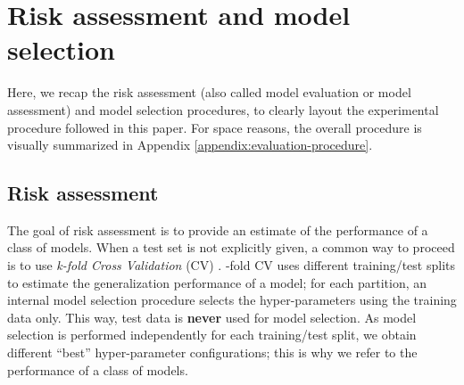 \documentclass{article}
\newcommand{\quotes}[1]{``#1''}
\begin{document}
 \section{Risk assessment and model selection} \label{sec:model-selection-evaluation}
Here, we recap the risk assessment (also called model evaluation or model assessment) and model selection procedures, to clearly layout the experimental procedure followed in this paper. For space reasons, the overall procedure is visually summarized in Appendix \ref{appendix:evaluation-procedure}.

\subsection{Risk assessment}
The goal of risk assessment is to provide an estimate of the performance of a class of models. When a test set is not explicitly given, a common way to proceed is to use \emph{k-fold Cross Validation} (CV) \citep{stone-cv,varma-cv, overfitting-model-selection}. -fold CV uses  different training/test splits to estimate the generalization performance of a model; for each partition, an internal model selection procedure selects the hyper-parameters using the training data only. This way, test data is \textbf{never} used for model selection. As model selection is performed independently for each training/test split, we obtain different \quotes{best} hyper-parameter configurations; this is why we refer to the performance of a class of models.
\end{document}
